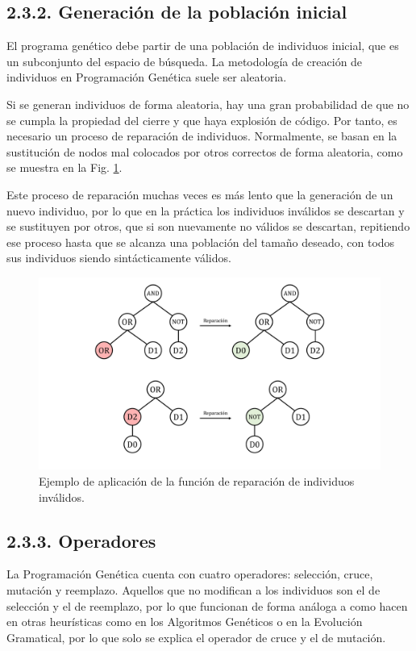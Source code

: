 \documentclass[spanish,a4paper,12pt,twoside]{report}
\begin{document}
    \subsection*{\large 2.3.2. Generación de la población inicial}
    El programa genético debe partir de una población de individuos inicial, que es un subconjunto del espacio de búsqueda. La metodología de creación de individuos en Programación Genética suele ser aleatoria. \par
    Si se generan individuos de forma aleatoria, hay una gran probabilidad de que no se cumpla la propiedad del cierre y que haya explosión de código. Por tanto, es necesario un proceso de reparación de individuos. Normalmente, se basan en la sustitución de nodos mal colocados por otros correctos de forma aleatoria, como se muestra en la Fig. \ref{fig:5}. \par
    Este proceso de reparación muchas veces es más lento que la generación de un nuevo individuo, por lo que en la práctica los individuos inválidos se descartan y se sustituyen por otros, que si son nuevamente no válidos se descartan, repitiendo ese proceso hasta que se alcanza una población del tamaño deseado, con todos sus individuos siendo sintácticamente válidos.
    \begin{figure}[H]
      \centering
      \includegraphics[width = 1\textwidth]{resources/Fig5.pdf}
      \caption{Ejemplo de aplicación de la función de reparación de individuos inválidos.}
      \label{fig:5}
    \end{figure} \par
  
    \subsection*{\large 2.3.3. Operadores}
    La Programación Genética cuenta con cuatro operadores: selección, cruce, mutación y reemplazo. Aquellos que no modifican a los individuos son el de selección y el de reemplazo, por lo que funcionan de forma análoga a como hacen en otras heurísticas como en los Algoritmos Genéticos o en la Evolución Gramatical, por lo que solo se explica el operador de cruce y el de mutación.
    
\end{document}
